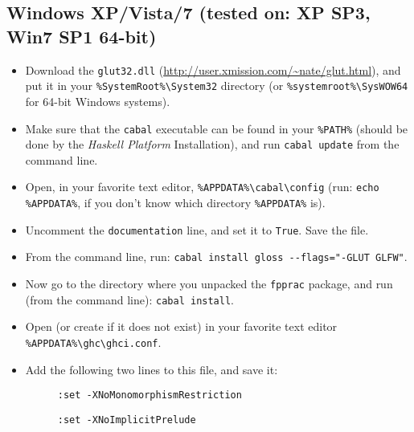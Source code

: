\documentclass[]{article}
\begin{document}
\subsection{Windows XP/Vista/7 (tested on: XP SP3, Win7 SP1 64-bit)}
\begin{itemize}
  \item Download the \texttt{glut32.dll} (\url{http://user.xmission.com/~nate/glut.html}), and put it in your\newline{} \texttt{\%SystemRoot\%\textbackslash{}System32} directory (or \texttt{\%systemroot\%\textbackslash{}SysWOW64} for 64-bit Windows systems).
  \item Make sure that the \texttt{cabal} executable can be found in your \texttt{\%PATH\%} (should be done by the \emph{Haskell Platform} Installation), and run \texttt{cabal update} from the command line.
  \item Open, in your favorite text editor, \texttt{\%APPDATA\%\textbackslash{}cabal\textbackslash{}config} (run: \texttt{echo \%APPDATA\%}, if you don't know which directory \texttt{\%APPDATA\%} is).
  \item Uncomment the \texttt{documentation} line, and set it to \texttt{True}. Save the file.
  \item From the command line, run: \texttt{cabal install gloss -{}-flags="-GLUT GLFW"}.
  \item Now go to the directory where you unpacked the \texttt{fpprac} package, and run (from the command line): \texttt{cabal install}.
  \item Open (or create if it does not exist) in your favorite text editor \texttt{\%APPDATA\%\textbackslash{}ghc\textbackslash{}ghci.conf}.
  \item Add the following two lines to this file, and save it:
  \begin{description}
    \item[] \texttt{:set -XNoMonomorphismRestriction}
    \item[] \texttt{:set -XNoImplicitPrelude}
  \end{description}
\end{itemize}
\end{document}
